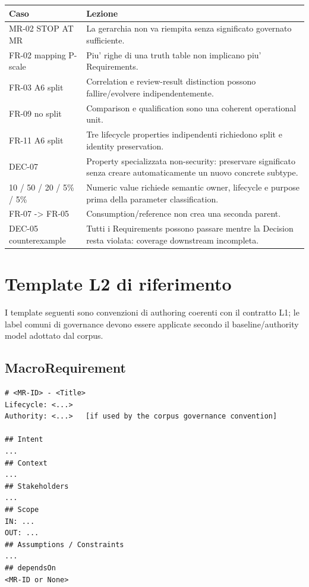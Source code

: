 \documentclass[11pt,a4paper]{article}
\begin{document}
\begin{tabularx}{\textwidth}{L{48mm}Y}
\toprule
\textbf{Caso} & \textbf{Lezione} \\
\midrule
MR-02 STOP AT MR & La gerarchia non va riempita senza significato governato sufficiente. \\
FR-02 mapping P-scale & Piu' righe di una truth table non implicano piu' Requirements. \\
FR-03 A6 split & Correlation e review-result distinction possono fallire/evolvere indipendentemente. \\
FR-09 no split & Comparison e qualification sono una coherent operational unit. \\
FR-11 A6 split & Tre lifecycle properties indipendenti richiedono split e identity preservation. \\
DEC-07 & Property specializzata non-security: preservare significato senza creare automaticamente un nuovo concrete subtype. \\
10 / 50 / 20 / 5\% / 5\% & Numeric value richiede semantic owner, lifecycle e purpose prima della parameter classification. \\
FR-07 -> FR-05 & Consumption/reference non crea una seconda parent. \\
DEC-05 counterexample & Tutti i Requirements possono passare mentre la Decision resta violata: coverage downstream incompleta. \\
\bottomrule
\end{tabularx}

\section{Template L2 di riferimento}

I template seguenti sono convenzioni di authoring coerenti con il contratto L1; le label comuni di governance devono essere applicate secondo il baseline/authority model adottato dal corpus.

\subsection{MacroRequirement}
\begin{lstlisting}
# <MR-ID> - <Title>
Lifecycle: <...>
Authority: <...>   [if used by the corpus governance convention]

## Intent
...
## Context
...
## Stakeholders
...
## Scope
IN: ...
OUT: ...
## Assumptions / Constraints
...
## dependsOn
<MR-ID or None>
\end{lstlisting}
\end{document}
